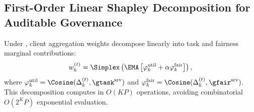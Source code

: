 \subsection{First-Order Linear Shapley Decomposition for Auditable Governance}
\begin{proposition}
\label{prop:linear_shapley}
Under \MethodName{}, client aggregation weights decompose linearly into task and fairness marginal contributions:
\begin{equation}
w_k^{(t)} = \Simplex\left( \EMA\left[ \varphi_k^{\mathrm{util}} + \alpha \varphi_k^{\mathrm{fair}} \right] \right),
\end{equation}
where $\varphi_k^{\mathrm{util}} = \Cosine(\Delta_k^{(t)}, \gtask^{\mathrm{srv}})$ and $\varphi_k^{\mathrm{fair}} = \Cosine(\Delta_k^{(t)}, \gfair^{\mathrm{srv}})$. This decomposition computes in $O(KP)$ operations, avoiding combinatorial $O(2^K P)$ exponential evaluation.
\end{proposition}

